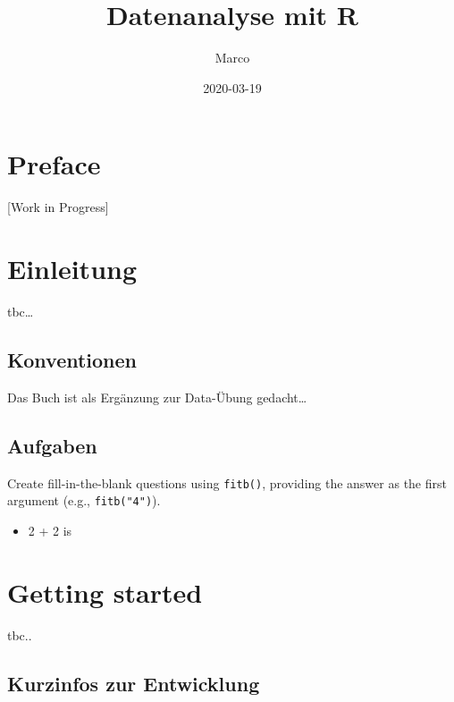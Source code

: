\documentclass[
]{book}
\title{Datenanalyse mit R}
\author{Marco}
\date{2020-03-19}
\providecommand{\tightlist}{%
  \setlength{\itemsep}{0pt}\setlength{\parskip}{0pt}}
\begin{document}
\maketitle

{
\setcounter{tocdepth}{1}
\tableofcontents
}
\hypertarget{preface}{%
\chapter*{Preface}\label{preface}}

{[}Work in Progress{]}

\hypertarget{einleitung}{%
\chapter*{Einleitung}\label{einleitung}}

tbc\ldots{}

\hypertarget{konventionen}{%
\section*{Konventionen}\label{konventionen}}

Das Buch ist als Ergänzung zur Data-Übung gedacht\ldots{}

\hypertarget{aufgaben}{%
\section*{Aufgaben}\label{aufgaben}}

Create fill-in-the-blank questions using \texttt{fitb()}, providing the answer as the first argument (e.g., \texttt{fitb("4")}).

\begin{itemize}
\tightlist
\item
  2 + 2 is 
\end{itemize}

\hypertarget{start}{%
\chapter{Getting started}\label{start}}

tbc..

\hypertarget{kurzinfos-zur-entwicklung}{%
\section{Kurzinfos zur Entwicklung}\label{kurzinfos-zur-entwicklung}}
\end{document}

